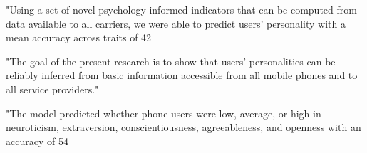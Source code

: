 "Using a set of novel psychology-informed indicators that can be computed from data available to all carriers, we were able to predict users’ personality with a mean accuracy across traits of 42%

"The goal of the present research is to show that users’ personalities can be reliably inferred from basic information accessible from all mobile phones and to all service providers."

"The model predicted whether phone users were low, average, or high in neuroticism, extraversion, conscientiousness, agreeableness, and openness with an accuracy of 54%


